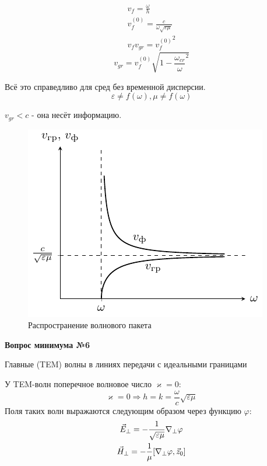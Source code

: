 \documentclass[a4paper,14pt]{extarticle}
\newcommand{\ticket}[1] {
\newpage
\hypertarget{num#1}{}
\begin{center}
	\textbf{Вопрос минимума №#1 }
\end{center}
}
\begin{document}
\begin{enumerate}
	\begin{gather*}
	v_{f} = \frac{\omega}{h}\\
	v_{f}^{(0)} = \frac{c}{\omega \sqrt{\varepsilon \mu}}\\
	v_{f} v_{gr} = {v_f^{(0)}}^2
	\end{gather*}
	\begin{equation*}
	v_{gr} = v_{f}^{(0)} \sqrt{1 - {\frac{\omega_{cr}}{\omega}^2}}
	\end{equation*}
	
	Всё это справедливо для сред без временной дисперсии.
	\begin{equation*}
	\varepsilon\ne f(\omega), \mu \ne f(\omega)
	\end{equation*}
	

	
	$v_{gr} < c$ - она несёт информацию.
\end{enumerate}
\begin{figure}[h!]
	\centering
	\includegraphics[scale=1]{img/lect3_ris10}
	\caption{Распространение волнового пакета}
	\label{fig:lect3:10}
\end{figure}

\ticket{6}
Главные (TEM) волны в линиях передачи с идеальными границами

У TEM-волн поперечное волновое число $\varkappa=0$:
\begin{equation*}
\varkappa=0 \Rightarrow h=k= \frac{\omega}{c}\sqrt{\varepsilon \mu}
\end{equation*}
Поля таких волн выражаются следующим образом через функцию $\varphi$:
\begin{gather*}
\label{eperp}
\vec{E}_\perp=-\frac{1}{\sqrt{\varepsilon \mu}}\nabla_\perp \varphi\\
\vec{H}_\perp=-\frac{1}{\mu}\qty[\nabla_\perp \varphi,\vec{z}_0]
\end{gather*}
\end{document}
